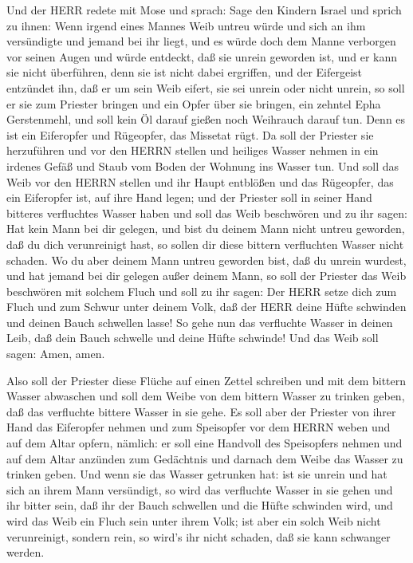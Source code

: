  Und der HERR redete mit Mose und sprach: 
Sage den Kindern Israel und sprich zu ihnen: Wenn irgend eines Mannes
Weib untreu würde und sich an ihm versündigte  und jemand
bei ihr liegt, und es würde doch dem Manne verborgen vor seinen Augen
und würde entdeckt, daß sie unrein geworden ist, und er kann sie nicht
überführen, denn sie ist nicht dabei ergriffen,  und der
Eifergeist entzündet ihn, daß er um sein Weib eifert, sie sei unrein
oder nicht unrein,  so soll er sie zum Priester bringen und
ein Opfer über sie bringen, ein zehntel Epha Gerstenmehl, und soll kein
Öl darauf gießen noch Weihrauch darauf tun. Denn es ist ein Eiferopfer
und Rügeopfer, das Missetat rügt.  Da soll der Priester sie
herzuführen und vor den HERRN stellen  und heiliges Wasser
nehmen in ein irdenes Gefäß und Staub vom Boden der Wohnung ins Wasser
tun.  Und soll das Weib vor den HERRN stellen und ihr Haupt
entblößen und das Rügeopfer, das ein Eiferopfer ist, auf ihre Hand
legen; und der Priester soll in seiner Hand bitteres verfluchtes Wasser
haben  und soll das Weib beschwören und zu ihr sagen: Hat
kein Mann bei dir gelegen, und bist du deinem Mann nicht untreu
geworden, daß du dich verunreinigt hast, so sollen dir diese bittern
verfluchten Wasser nicht schaden.  Wo du aber deinem Mann
untreu geworden bist, daß du unrein wurdest, und hat jemand bei dir
gelegen außer deinem Mann,  so soll der Priester das Weib
beschwören mit solchem Fluch und soll zu ihr sagen: Der HERR setze dich
zum Fluch und zum Schwur unter deinem Volk, daß der HERR deine Hüfte
schwinden und deinen Bauch schwellen lasse!  So gehe nun
das verfluchte Wasser in deinen Leib, daß dein Bauch schwelle und deine
Hüfte schwinde! Und das Weib soll sagen: Amen, amen.

 Also soll der Priester diese Flüche auf einen Zettel
schreiben und mit dem bittern Wasser abwaschen  und soll
dem Weibe von dem bittern Wasser zu trinken geben, daß das verfluchte
bittere Wasser in sie gehe.  Es soll aber der Priester von
ihrer Hand das Eiferopfer nehmen und zum Speisopfer vor dem HERRN weben
und auf dem Altar opfern, nämlich:  er soll eine Handvoll
des Speisopfers nehmen und auf dem Altar anzünden zum Gedächtnis und
darnach dem Weibe das Wasser zu trinken geben.  Und wenn
sie das Wasser getrunken hat: ist sie unrein und hat sich an ihrem Mann
versündigt, so wird das verfluchte Wasser in sie gehen und ihr bitter
sein, daß ihr der Bauch schwellen und die Hüfte schwinden wird, und wird
das Weib ein Fluch sein unter ihrem Volk;  ist aber ein
solch Weib nicht verunreinigt, sondern rein, so wird's ihr nicht
schaden, daß sie kann schwanger werden.

